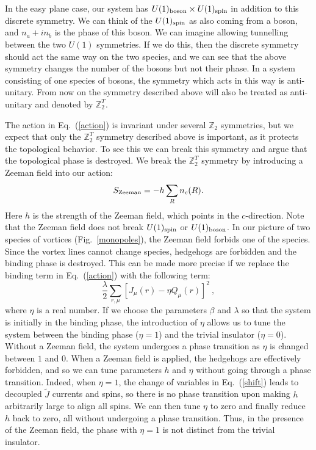 \documentclass[prb,twocolumn]{revtex4-1}
\def\ztwo{\mathbb{Z}_2}
\def\ztwot{\mathbb{Z}_2^T}
\begin{document}
In the easy plane case, our system has $U(1)_{\rm boson}\times U(1)_{\rm spin}$ in addition to this discrete symmetry. We can think of the $U(1)_{\rm spin}$ as also coming from a boson, and $n_a+i n_b$ is the phase of this boson. We can imagine allowing tunnelling between the two $U(1)$ symmetries. If we do this, then the discrete symmetry should act the same way on the two species, and we can see that the above symmetry changes the number of the bosons but not their phase. In a system consisting of one species of bosons, the symmetry which acts in this way is anti-unitary.
From now on the symmetry described above will also be treated as anti-unitary and denoted by $\ztwot$.

The action in Eq.~(\ref{action}) is invariant under several $\ztwo$ symmetries, but we expect that only the $\ztwot$ symmetry described above is important, as it protects the topological behavior. To see this we can break this symmetry and argue that the topological phase is destroyed.
We break the $\ztwot$ symmetry by introducing a Zeeman field into our action:
\begin{equation}
S_{\rm Zeeman}=-h\sum_R n_c(R).
\label{Zeeman}
\end{equation}
Here $h$ is the strength of the Zeeman field, which points in the $c$-direction. Note that the Zeeman field does not break $U(1)_{\rm spin}$ or $U(1)_{\rm boson}$. In our picture of two species of vortices (Fig.~\ref{monopoles}), the Zeeman field forbids one of the species. Since the vortex lines cannot change species, hedgehogs are forbidden and the binding phase is destroyed. 
This can be made more precise if we replace the binding term in Eq.~(\ref{action}) with the following term:
\begin{equation}
\frac{\lambda}{2}\sum_{r,\mu} [ J_\mu(r) - \eta Q_\mu(r)]^2 ~,
\label{tbind}
\end{equation}
where $\eta$ is a real number. If we choose the parameters $\beta$ and $\lambda$ so that the system is initially in the binding phase, the introduction of $\eta$ allows us to tune the system between the binding phase ($\eta=1$) and the trivial insulator ($\eta=0$). Without a Zeeman field, the system undergoes a phase transition as $\eta$ is changed between $1$ and $0$. 
When a Zeeman field is applied, the hedgehogs are effectively forbidden, and so we can tune parameters $h$ and $\eta$ without going through a phase transition. Indeed, when $\eta=1$, the change of variables in Eq.~(\ref{shift}) leads to decoupled $\tilde{J}$ currents and spins, so there is no phase transition upon making $h$ arbitrarily large to align all spins. We can then tune $\eta$ to zero and finally reduce $h$ back to zero, all without undergoing a phase transition.  Thus, in the presence of the Zeeman field, the phase with $\eta=1$ is not distinct from the trivial insulator.
\end{document}
